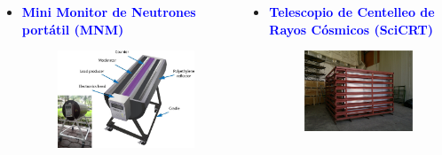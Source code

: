 \begin{frame}{}
\begin{columns}
\begin{column}{0.5\textwidth}
\begin{itemize}
                     \item \textcolor{blue}{\textbf{Mini Monitor de Neutrones portátil (MNM)}}
                     \begin{figure}
                         \centering
                         \includegraphics[width=0.6\linewidth]{Figures/detector1.jpg}
                     \end{figure}                     
                \end{itemize}
            \end{column}

            \begin{column}{0.5\textwidth} %
                \begin{itemize}
                    \item \textcolor{blue}{\textbf{Telescopio de Centelleo de Rayos Cósmicos (SciCRT)}}
                     \begin{figure}
                         \centering
                         \includegraphics[width=0.5\linewidth]{Figures/scicrt-real.png}
                     \end{figure}


\end{itemize}
\end{column}
\end{columns}
\end{frame}
